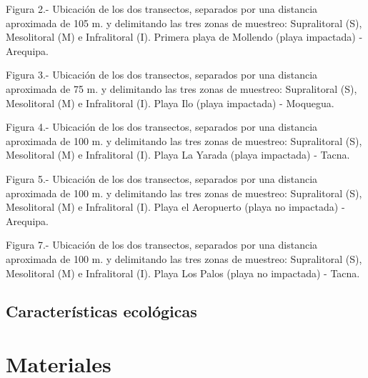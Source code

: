 \documentclass[5p,times,authoryear]{elsarticle}
\begin{document}
Figura 2.- Ubicaci\'on de los dos transectos, separados por una distancia aproximada de 105 m. y delimitando las tres zonas de muestreo: Supralitoral (S), Mesolitoral (M) e Infralitoral (I). Primera playa de Mollendo (playa impactada) - Arequipa.

Figura 3.- Ubicaci\'on de los dos transectos, separados por una distancia aproximada de 75 m. y delimitando las tres zonas de muestreo: Supralitoral (S), Mesolitoral (M) e Infralitoral (I). Playa Ilo (playa impactada) - Moquegua.

Figura 4.- Ubicaci\'on de los dos transectos, separados por una distancia aproximada de 100 m. y delimitando las tres zonas de muestreo: Supralitoral (S), Mesolitoral (M) e Infralitoral (I). Playa La Yarada (playa impactada) - Tacna.

Figura 5.- Ubicaci\'on de los dos transectos, separados por una distancia aproximada de 100 m. y delimitando las tres zonas de muestreo: Supralitoral (S), Mesolitoral (M) e Infralitoral (I). Playa el Aeropuerto (playa no impactada) - Arequipa.
 

Figura 7.- Ubicaci\'on de los dos transectos, separados por una distancia aproximada de 100 m. y delimitando las tres zonas de muestreo: Supralitoral (S), Mesolitoral (M) e Infralitoral (I). Playa Los Palos (playa no impactada) - Tacna.

\subsection{Caracter\'isticas ecol\'ogicas}


\section{Materiales}
\end{document}

